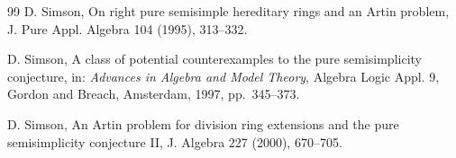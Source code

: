 \documentclass[11pt,a4paper]{amsart}
\numberwithin{equation}{section}
\begin{document}
\begin{thebibliography}{99}
 D. Simson, On right pure semisimple hereditary rings and an Artin problem, J. Pure Appl. Algebra 104 (1995), 313--332.

 D. Simson, A class of potential counterexamples to the pure semisimplicity conjecture, in: \emph{Advances in Algebra and Model Theory}, Algebra Logic Appl. 9, Gordon and Breach, Amsterdam, 1997, pp.~345--373.

 D. Simson, An Artin problem for division ring extensions and the pure semisimplicity conjecture II, J. Algebra 227 (2000), 670--705.

\end{thebibliography}
\end{document}
